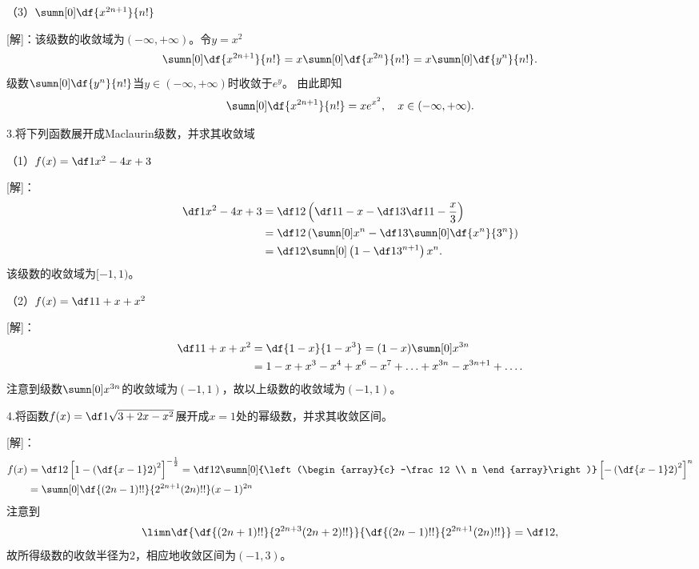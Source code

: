 （3）$\sumn[0]\df{x^{2n+1}}{n!}$

[解]：该级数的收敛域为$(-\infty,+\infty)$。令$y=x^2$
$$\sumn[0]\df{x^{2n+1}}{n!}=x\sumn[0]\df{x^{2n}}{n!}
=x\sumn[0]\df{y^n}{n!}.$$
级数$\sumn[0]\df{y^n}{n!}$当$y\in(-\infty,+\infty)$时收敛于$e^y$。
由此即知
$$\sumn[0]\df{x^{2n+1}}{n!}=xe^{x^2},\quad x\in(-\infty,+\infty).$$
\fin

\bs

3.将下列函数展开成Maclaurin级数，并求其收敛域

% 

（1）$f(x)=\df1{x^2-4x+3}$

[解]：
\begin{align*}
	\df1{x^2-4x+3}&=\df12\left(\df1{1-x}-\df13\df1{1-\frac x3}\right)\\
	&=\df12\left(\sumn[0]x^n-\df13\sumn[0]\df{x^n}{3^n}\right)\\
	&=\df12\sumn[0]\left(1-\df1{3^{n+1}}\right)x^n.
\end{align*}
该级数的收敛域为$[-1,1)$。

（2）$f(x)=\df 1{1+x+x^2}$

[解]：
\begin{align*}
	\df 1{1+x+x^2}
	&=\df{1-x}{1-x^3}=(1-x)\sumn[0]x^{3n}\\
	&=1-x+x^3-x^4+x^6-x^7+\ldots+x^{3n}-x^{3n+1}+\ldots.
\end{align*}
注意到级数$\sumn[0]x^{3n}$的收敛域为$(-1,1)$，故以上级数的收敛域为$(-1,1)$。\fin

\bs

4.将函数$f(x)=\df1{\sqrt{3+2x-x^2}}$展开成$x=1$处的幂级数，并求其收敛区间。

[解]：
\begin{align*}
	f(x)
	&=\df12\left[1-\left(\df{x-1}2\right)^2\right]^{-\frac12}
	=\df12\sumn[0]{\left(\begin{array}{c}
		-\frac12 \\ n
	\end{array}\right)}\left[-\left(\df{x-1}2\right)^2\right]^n\\
	&=\sumn[0]\df{(2n-1)!!}{2^{2n+1}(2n)!!}(x-1)^{2n}
\end{align*}
注意到
$$\limn\df{\df{(2n+1)!!}{2^{2n+3}(2n+2)!!}}{\df{(2n-1)!!}{2^{2n+1}(2n)!!}}=\df12,$$
故所得级数的收敛半径为$2$，相应地收敛区间为$(-1,3)$。
\fin

